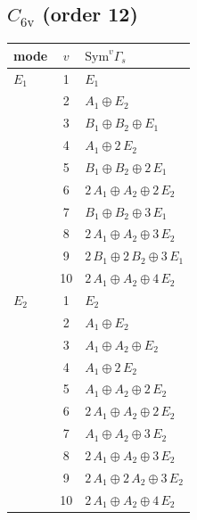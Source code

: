 \documentclass[11pt]{article}
\begin{document}
\subsection*{$C_{6\mathrm{v}}$ \quad (order 12)}
\begin{longtable}{l c p{}}
\hline mode & $v$ & $\mathrm{Sym}^v\Gamma_s$\\ \hline\endhead
$E_{1}$ & 1 & $E_{1}$\\
 & 2 & $A_{1}\oplus E_{2}$\\
 & 3 & $B_{1}\oplus B_{2}\oplus E_{1}$\\
 & 4 & $A_{1}\oplus 2\,E_{2}$\\
 & 5 & $B_{1}\oplus B_{2}\oplus 2\,E_{1}$\\
 & 6 & $2\,A_{1}\oplus A_{2}\oplus 2\,E_{2}$\\
 & 7 & $B_{1}\oplus B_{2}\oplus 3\,E_{1}$\\
 & 8 & $2\,A_{1}\oplus A_{2}\oplus 3\,E_{2}$\\
 & 9 & $2\,B_{1}\oplus 2\,B_{2}\oplus 3\,E_{1}$\\
 & 10 & $2\,A_{1}\oplus A_{2}\oplus 4\,E_{2}$\\
\hline
$E_{2}$ & 1 & $E_{2}$\\
 & 2 & $A_{1}\oplus E_{2}$\\
 & 3 & $A_{1}\oplus A_{2}\oplus E_{2}$\\
 & 4 & $A_{1}\oplus 2\,E_{2}$\\
 & 5 & $A_{1}\oplus A_{2}\oplus 2\,E_{2}$\\
 & 6 & $2\,A_{1}\oplus A_{2}\oplus 2\,E_{2}$\\
 & 7 & $A_{1}\oplus A_{2}\oplus 3\,E_{2}$\\
 & 8 & $2\,A_{1}\oplus A_{2}\oplus 3\,E_{2}$\\
 & 9 & $2\,A_{1}\oplus 2\,A_{2}\oplus 3\,E_{2}$\\
 & 10 & $2\,A_{1}\oplus A_{2}\oplus 4\,E_{2}$\\
\hline
\end{longtable}
\end{document}
